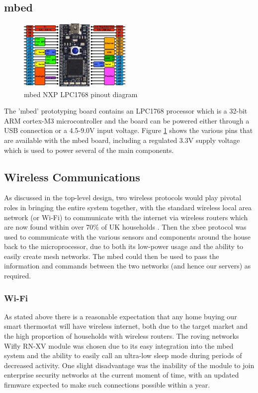 \documentclass[10.5pt,a4paper,twoside]{report}   %
\begin{document}
\subsection{mbed}
\begin{figure}
  \vspace{-40pt}
  \begin{center}
    \includegraphics[width=0.48\textwidth]{images/mbed.png}
  \end{center}
  \vspace{-20pt}
  \caption{mbed NXP LPC1768 pinout diagram}
\label{fig:mbed}
  \vspace{-30pt}
\end{figure}
The 'mbed' prototyping board contains an LPC1768 processor which is a 32-bit ARM cortex-M3 microcontroller\cite{mbeddatasheet}  and the board can be powered either through a USB connection or a 4.5-9.0V input voltage. Figure \ref{fig:mbed} shows the various pins that are available with the mbed board, including a regulated 3.3V supply voltage which is used to power several of the main components. 
\subsection{Wireless Communications}
As discussed in the top-level design, two wireless protocols would play pivotal roles in bringing the entire system together, with the standard wireless local area network (or Wi-Fi) to communicate with the internet via wireless routers which are now found within over 70\% of UK households \cite{homewifi}. Then the xbee protocol was used to communicate with the various sensors and components around the house back to the microprocessor, due to both its low-power usage and the ability to easily create mesh networks. The mbed could then be used to pass the information and commands between the two networks (and hence our servers) as required.
\subsubsection{Wi-Fi}
As stated above there is a reasonable expectation that any home buying our smart thermostat will have wireless internet, both due to the target market and the high proportion of households with wireless routers.  The roving networks Wifly RN-XV module was chosen due to its easy integration into the mbed system and the ability to easily call an ultra-low sleep mode during periods of decreased activity. One slight disadvantage was the inability of the module to join enterprise security networks at the current moment of time, with an updated firmware expected to make such connections possible within a year.
\end{document}
